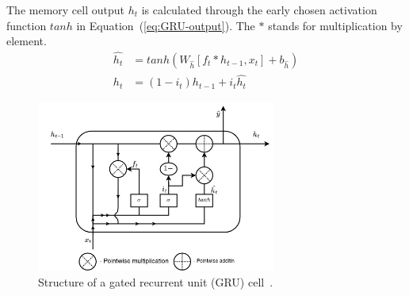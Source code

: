 The memory cell output $h_t$ is calculated through the early chosen activation function $tanh$ in \mbox{Equation~(\ref{eq:GRU-output})}.
The $\ast$ stands for multiplication by element.
\begin{equation}
    \begin{split}
        \hat{h_t} &= tanh \left( W_{\hat{h}} \left[ f_t \ast h_{t-1}, x_t \right] + b_{\hat{h}} \right) \\
        h_t &= \left( 1-i_t \right) h_{t-1}+i_t \hat{h_t}
    \end{split}
    \label{eq:GRU-output}
\end{equation}    
\begin{figure}[H]%
    \includegraphics[width=0.70\textwidth]{II_Body/GRU/images/GRU.jpg}
    \caption{Structure of a gated recurrent unit (GRU) cell~\cite{li_approach_2019}.}
    \label{fig:GRU-cell}
\end{figure}
%
%
%
